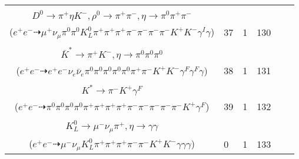 \documentclass[landscape]{article}
\newcounter{rownumbers}
\newcommand\rn{\stepcounter{rownumbers}\arabic{rownumbers}}
\newcommand{\EOLP}{\\ \hline} %
\newcommand{\topoTags}[1]{#1} %
\begin{document}
\begin{longtable}{clcccc}
\rn & \makecell[l]{ $ 
e^{+} e^{-} \rightarrow \bar{K}^{0} K^{+} D^{-} D^{*0} \gamma^{I} ,
\bar{K}^{0} \rightarrow K_{L}^{0} ,
D^{-} \rightarrow K_{L}^{0} \pi^{-} \eta^{\prime} ,
D^{*0} \rightarrow \pi^{0} D^{0} ,
K_{L}^{0} \rightarrow \mu^{+} \nu_{\mu} \pi^{-} ,
\eta^{\prime} \rightarrow \rho^{0} \gamma ,
$ \\ $
D^{0} \rightarrow \pi^{+} \eta K^{-} ,
\rho^{0} \rightarrow \pi^{+} \pi^{-} ,
\eta \rightarrow \pi^{0} \pi^{+} \pi^{-} 
$ \\ ($
e^{+} e^{-} \dashrightarrow \mu^{+} \nu_{\mu} \pi^{0} \pi^{0} K_{L}^{0} \pi^{+} \pi^{+} \pi^{+} \pi^{-} \pi^{-} \pi^{-} \pi^{-} K^{+} K^{-} \gamma^{I} \gamma 
$) } & \topoTags{37 & }1 & 130 \EOLP

\rn & \makecell[l]{ $ 
e^{+} e^{-} \rightarrow \rho^{-} K^{+} D^{*+} D_{s}^{*-} ,
\rho^{-} \rightarrow \pi^{0} \pi^{-} ,
D^{*+} \rightarrow \pi^{0} D^{+} ,
D_{s}^{*-} \rightarrow D_{s}^{-} \gamma ,
D^{+} \rightarrow e^{+} \nu_{e} \bar{K}^{*} \gamma^{F} ,
D_{s}^{-} \rightarrow e^{-} \bar{\nu}_{e} \eta \gamma^{F} ,
$ \\ $
\bar{K}^{*} \rightarrow \pi^{+} K^{-} ,
\eta \rightarrow \pi^{0} \pi^{0} \pi^{0} 
$ \\ ($
e^{+} e^{-} \dashrightarrow e^{+} e^{-} \nu_{e} \bar{\nu}_{e} \pi^{0} \pi^{0} \pi^{0} \pi^{0} \pi^{0} \pi^{+} \pi^{-} K^{+} K^{-} \gamma^{F} \gamma^{F} \gamma 
$) } & \topoTags{38 & }1 & 131 \EOLP

\rn & \makecell[l]{ $ 
e^{+} e^{-} \rightarrow \pi^{+} \omega D^{*-} D^{*0} ,
\omega \rightarrow \pi^{0} \pi^{+} \pi^{-} ,
D^{*-} \rightarrow \pi^{-} \bar{D}^{0} ,
D^{*0} \rightarrow \pi^{0} D^{0} ,
\bar{D}^{0} \rightarrow \pi^{+} \pi^{-} K^{*} ,
D^{0} \rightarrow \pi^{0} \pi^{0} \pi^{+} \pi^{-} ,
$ \\ $
K^{*} \rightarrow \pi^{-} K^{+} \gamma^{F} 
$ \\ ($
e^{+} e^{-} \dashrightarrow \pi^{0} \pi^{0} \pi^{0} \pi^{0} \pi^{+} \pi^{+} \pi^{+} \pi^{+} \pi^{-} \pi^{-} \pi^{-} \pi^{-} \pi^{-} K^{+} \gamma^{F} 
$) } & \topoTags{39 & }1 & 132 \EOLP

\rn & \makecell[l]{ $ 
e^{+} e^{-} \rightarrow \pi^{+} K^{0} D_{s}^{*-} D_{0}^{*0} ,
K^{0} \rightarrow K_{L}^{0} ,
D_{s}^{*-} \rightarrow D_{s}^{-} \gamma ,
D_{0}^{*0} \rightarrow \pi^{-} D^{+} ,
D_{s}^{-} \rightarrow \pi^{-} K^{+} K^{-} ,
D^{+} \rightarrow K_{L}^{0} \pi^{+} \eta ,
$ \\ $
K_{L}^{0} \rightarrow \mu^{-} \nu_{\mu} \pi^{+} ,
\eta \rightarrow \gamma \gamma 
$ \\ ($
e^{+} e^{-} \dashrightarrow \mu^{-} \nu_{\mu} K_{L}^{0} \pi^{+} \pi^{+} \pi^{+} \pi^{-} \pi^{-} K^{+} K^{-} \gamma \gamma \gamma 
$) } & \topoTags{0 & }1 & 133 \EOLP


\end{longtable}
\end{document}
